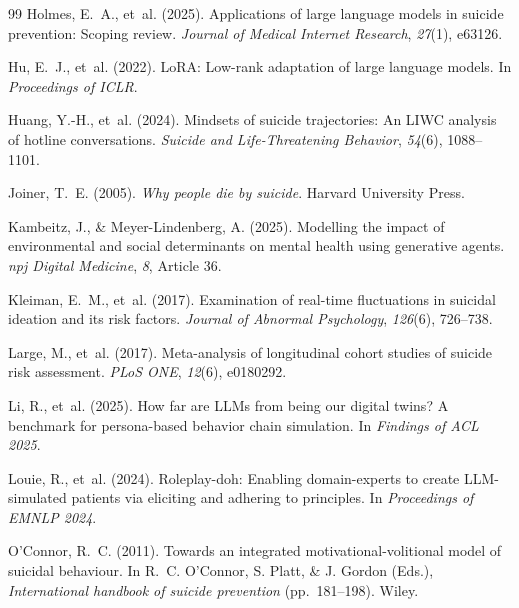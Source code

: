 \documentclass[review,12pt,authoryear]{elsarticle}
\begin{document}
\begin{thebibliography}{99}
Holmes, E.~A., et~al. (2025).
\newblock Applications of large language models in suicide prevention: {S}coping review.
\newblock \textit{Journal of Medical Internet Research}, \textit{27}(1), e63126.

Hu, E.~J., et~al. (2022).
\newblock Lo{RA}: {L}ow-rank adaptation of large language models.
\newblock In \textit{Proceedings of ICLR}.

Huang, Y.-H., et~al. (2024).
\newblock Mindsets of suicide trajectories: {A}n {LIWC} analysis of hotline conversations.
\newblock \textit{Suicide and Life-Threatening Behavior}, \textit{54}(6), 1088--1101.

Joiner, T.~E. (2005).
\newblock \textit{Why people die by suicide}.
\newblock Harvard University Press.

Kambeitz, J., \& Meyer-Lindenberg, A. (2025).
\newblock Modelling the impact of environmental and social determinants on mental health using generative agents.
\newblock \textit{npj Digital Medicine}, \textit{8}, Article 36.

Kleiman, E.~M., et~al. (2017).
\newblock Examination of real-time fluctuations in suicidal ideation and its risk factors.
\newblock \textit{Journal of Abnormal Psychology}, \textit{126}(6), 726--738.

Large, M., et~al. (2017).
\newblock Meta-analysis of longitudinal cohort studies of suicide risk assessment.
\newblock \textit{PLoS ONE}, \textit{12}(6), e0180292.


Li, R., et~al. (2025).
\newblock How far are {LLMs} from being our digital twins? {A} benchmark for persona-based behavior chain simulation.
\newblock In \textit{Findings of ACL 2025}.

Louie, R., et~al. (2024).
\newblock Roleplay-doh: {E}nabling domain-experts to create {LLM}-simulated patients via eliciting and adhering to principles.
\newblock In \textit{Proceedings of EMNLP 2024}.

O'Connor, R.~C. (2011).
\newblock Towards an integrated motivational-volitional model of suicidal behaviour.
\newblock In R.~C. O'Connor, S. Platt, \& J. Gordon (Eds.), \textit{International handbook of suicide prevention} (pp.\ 181--198). Wiley.


\end{thebibliography}
\end{document}
